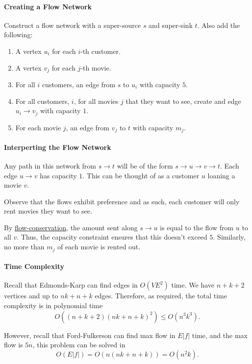 \paragraph{Creating a Flow Network}
Construct a flow network with a super-source \(s\) and super-sink \(t\).
Also add the following:
\begin{enumerate}
  \item A vertex \(u_i\) for  each \(i\)-th customer.
  \item A vertex \(v_j\) for each  \(j\)-th movie.
  \item For all \(i\) customers, an edge from \(s\) to \(u_i\) with capacity \(5\).
  \item For all  customers, \(i\),  for all movies \(j\) that they want to see,
    create and edge  \(u_i \to  v_j\) with capacity \(1\).
  \item For each movie \(j\), an edge from \(v_j\) to \(t\) with capacity \(m_j\).
\end{enumerate}

\paragraph{Interperting the Flow Network}
Any path in this network from \(s \to t\) will be of the form
\(s \to u \to v \to t\).
Each edge \(u \to v\) has capacity \(1\). This can be thought of
as a customer \(u\) loaning a movie \(v\).

Observe that the flows exhibit preference and as such, each customer will
only rent movies they want to see.

By \underline{flow-conservation}, the amount sent along
\(s \to u\) is equal to the flow from \(u\) to all \(v\).
Thus, the capacity constraint ensures that this doesn't exceed \(5\).
Similarly, no more than \(m_j\) of each movie is rented out.

\paragraph{Time Complexity}
Recall that Edmonds-Karp can find edges in \(O(VE^2)\) time.
We have  \(n + k + 2\) vertices and up to \(nk + n + k\) edges.
Therefore, as required, the total time complexity is in
polynomial time  \[
  O(\left( n + k + 2 \right) \left( nk + n + k \right)^2) \leq O(n^3k^3)
.\] 

However, recall that Ford-Fulkerson can find max flow in \(E|f|\) time,
and the max flow is \(5n\), this problem can be solved in \[
  O(E|f|) = O(n(nk + n + k)) = O(n^2k)
.\] 
